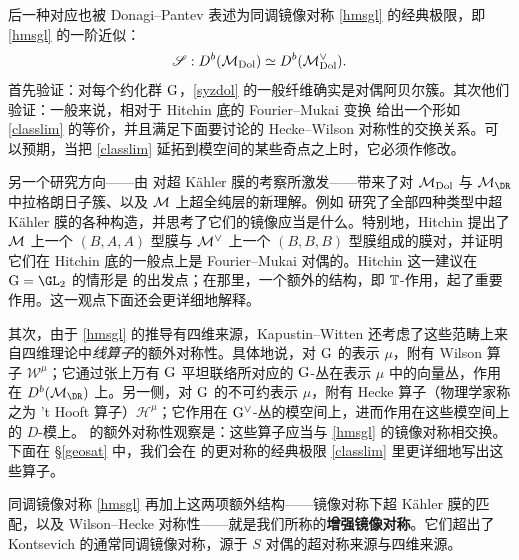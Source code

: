 后一种对应也被 Donagi--Pantev \cite{donagi-pantev} 表述为同调镜像对称 \eqref{hmsgl} 的经典极限，即 \eqref{hmsgl} 的一阶近似：
\begin{equation}\label{classlim}
\mathscr{S}:D^b({\mathcal{M}}_{\mathrm{Dol}})\simeq D^b({\mathcal{M}}_{\mathrm{Dol}}^\vee).
\end{equation}
\cite{donagi-pantev} 首先验证：对每个约化群 $\mathrm{G}$，\eqref{syzdol} 的一般纤维确实是对偶阿贝尔簇。其次他们验证：一般来说，相对于 Hitchin 底的 Fourier--Mukai 变换 \cite{mukai} 给出一个形如 \eqref{classlim} 的等价，并且满足下面要讨论的 Hecke--Wilson 对称性的交换关系。可以预期，当把 \eqref{classlim} 延拓到模空间的某些奇点之上时，它必须作修改。

另一个研究方向——由 \cite{kapustin-witten} 对超 Kähler 膜的考察所激发——带来了对 ${\mathcal{M}}_{\mathrm{Dol}}$ 与 $\M_\DR$ 中拉格朗日子簇、以及 ${\mathcal{M}}$ 上超全纯层的新理解。例如 \cite{baraglia-schaposnik,garcia-prada-etal,hitchin-characteristic} 研究了全部四种类型中超 Kähler 膜的各种构造，并思考了它们的镜像应当是什么。特别地，Hitchin \cite{hitchin-characteristic} 提出了 ${\mathcal{M}}$ 上一个 $(B,A,A)$ 型膜与 ${\mathcal{M}}^\vee$ 上一个 $(B,B,B)$ 型膜组成的膜对，并证明它们在 Hitchin 底的一般点上是 Fourier--Mukai 对偶的。Hitchin 这一建议在 $\G=\GL_2$ 的情形是 \cite{hausel-mellit-pei} 的出发点；在那里，一个额外的结构，即 ${\mathbb{T}}$-作用，起了重要作用。这一观点下面还会更详细地解释。

其次，由于 \eqref{hmsgl} 的推导有四维来源，Kapustin--Witten 还考虑了这些范畴上来自四维理论中\emph{线算子}的额外对称性。具体地说，对 $\mathrm{G}$ 的表示 $\mu$，附有 Wilson 算子 $\mathscr{W}^\mu$；它通过张上万有 $\mathrm{G}$ 平坦联络所对应的 $\mathrm{G}$-丛在表示 $\mu$ 中的向量丛，作用在 $D^b(\M_\DR)$ 上。另一侧，对 $\mathrm{G}$ 的不可约表示 $\mu$，附有 Hecke 算子（物理学家称之为 't Hooft 算子）$\mathscr{H}^\mu$；它作用在 $\mathrm{G}^\vee$-丛的模空间上，进而作用在这些模空间上的 $D$-模上。\cite{kapustin-witten} 的额外对称性观察是：这些算子应当与 \eqref{hmsgl} 的镜像对称相交换。下面在 \S\ref{geosat} 中，我们会在 \cite{donagi-pantev} 的更对称的经典极限 \eqref{classlim} 里更详细地写出这些算子。

同调镜像对称 \eqref{hmsgl} 再加上这两项额外结构——镜像对称下超 Kähler 膜的匹配，以及 Wilson--Hecke 对称性——就是我们所称的\textbf{增强镜像对称}。它们超出了 Kontsevich 的通常同调镜像对称，源于 $S$ 对偶的超对称来源与四维来源。

